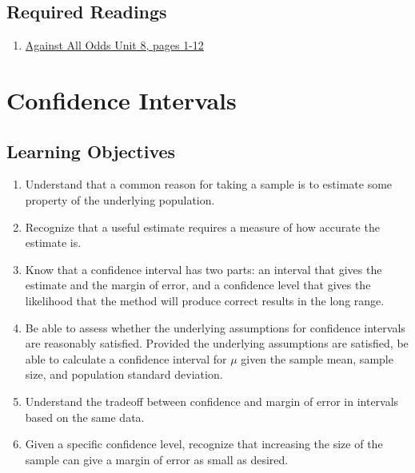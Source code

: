 \documentclass[letterpaper,9pt,twocolumn,twoside,printwatermark=false]{pinp}
\providecommand{\tightlist}{%
  \setlength{\itemsep}{0pt}\setlength{\parskip}{0pt}}
\begin{document}
\subsection{Required Readings}\label{required-readings}

\begin{enumerate}
\item \href{https://www.learner.org/courses/againstallodds/pdfs/AgainstAllOdds_StudentGuide_Unit08.pdf#page=1}{Against All Odds Unit 8, pages 1-12}
\end{enumerate}

\vspace*{0.25cm}

\section{Confidence Intervals}\label{confidence-intervals}

\subsection{Learning Objectives}\label{learning-objectives-1}

\begin{enumerate}
\def\labelenumi{\arabic{enumi}.}
\tightlist
\item
  Understand that a common reason for taking a sample is to estimate
  some property of the underlying population.
\item
  Recognize that a useful estimate requires a measure of how accurate
  the estimate is.
\item
  Know that a confidence interval has two parts: an interval that gives
  the estimate and the margin of error, and a confidence level that
  gives the likelihood that the method will produce correct results in
  the long range.
\item
  Be able to assess whether the underlying assumptions for confidence
  intervals are reasonably satisfied. Provided the underlying
  assumptions are satisfied, be able to calculate a confidence interval
  for \(\mu\) given the sample mean, sample size, and population
  standard deviation.
\item
  Understand the tradeoff between confidence and margin of error in
  intervals based on the same data.
\item
  Given a specific confidence level, recognize that increasing the size
  of the sample can give a margin of error as small as desired.
\end{enumerate}
\end{document}
